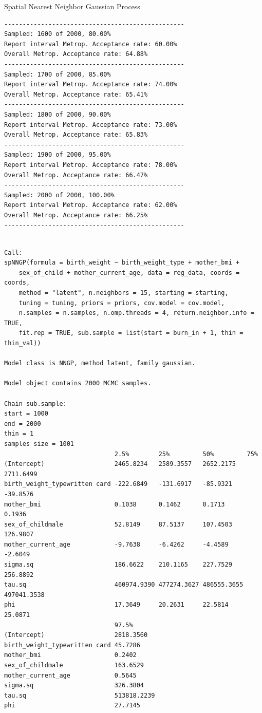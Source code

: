 \documentclass[
  ignorenonframetext,
]{beamer}
\begin{document}
\begin{frame}[fragile]{Spatial Nearest Neighbor Gaussian Process}
\begin{verbatim}
-------------------------------------------------
Sampled: 1600 of 2000, 80.00%
Report interval Metrop. Acceptance rate: 60.00%
Overall Metrop. Acceptance rate: 64.88%
-------------------------------------------------
Sampled: 1700 of 2000, 85.00%
Report interval Metrop. Acceptance rate: 74.00%
Overall Metrop. Acceptance rate: 65.41%
-------------------------------------------------
Sampled: 1800 of 2000, 90.00%
Report interval Metrop. Acceptance rate: 73.00%
Overall Metrop. Acceptance rate: 65.83%
-------------------------------------------------
Sampled: 1900 of 2000, 95.00%
Report interval Metrop. Acceptance rate: 78.00%
Overall Metrop. Acceptance rate: 66.47%
-------------------------------------------------
Sampled: 2000 of 2000, 100.00%
Report interval Metrop. Acceptance rate: 62.00%
Overall Metrop. Acceptance rate: 66.25%
-------------------------------------------------
\end{verbatim}

\begin{verbatim}

Call:
spNNGP(formula = birth_weight ~ birth_weight_type + mother_bmi + 
    sex_of_child + mother_current_age, data = reg_data, coords = coords, 
    method = "latent", n.neighbors = 15, starting = starting, 
    tuning = tuning, priors = priors, cov.model = cov.model, 
    n.samples = n.samples, n.omp.threads = 4, return.neighbor.info = TRUE, 
    fit.rep = TRUE, sub.sample = list(start = burn_in + 1, thin = thin_val))

Model class is NNGP, method latent, family gaussian.

Model object contains 2000 MCMC samples.

Chain sub.sample:
start = 1000
end = 2000
thin = 1
samples size = 1001
                              2.5%        25%         50%         75%        
(Intercept)                   2465.8234   2589.3557   2652.2175   2711.6499  
birth_weight_typewritten card -222.6849   -131.6917   -85.9321    -39.8576   
mother_bmi                    0.1038      0.1462      0.1713      0.1936     
sex_of_childmale              52.8149     87.5137     107.4503    126.9807   
mother_current_age            -9.7638     -6.4262     -4.4589     -2.6049    
sigma.sq                      186.6622    210.1165    227.7529    256.8892   
tau.sq                        460974.9390 477274.3627 486555.3655 497041.3538
phi                           17.3649     20.2631     22.5814     25.0871    
                              97.5%      
(Intercept)                   2818.3560  
birth_weight_typewritten card 45.7286    
mother_bmi                    0.2402     
sex_of_childmale              163.6529   
mother_current_age            0.5645     
sigma.sq                      326.3804   
tau.sq                        513818.2239
phi                           27.7145    
\end{verbatim}
\end{frame}
\end{document}

